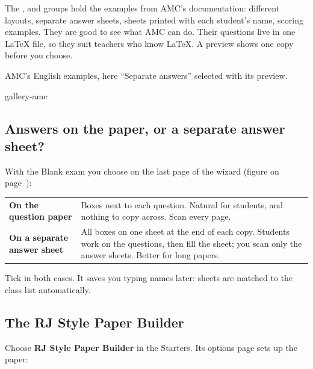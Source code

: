 \documentclass[11pt]{article}
\begin{document}
The ,  and  groups hold the examples from AMC's documentation: different layouts, separate answer sheets, sheets printed with each student's name, scoring examples. They are good to see what AMC can do. Their questions live in one LaTeX file, so they suit teachers who know LaTeX. A preview shows one copy before you choose.

\begin{guidefig}{AMC's English examples, here ``Separate answers'' selected with its preview.}
\begin{shot}{gallery-amc}
\end{shot}
\end{guidefig}

\subsection{Answers on the paper, or a separate answer sheet?}

With the Blank exam you choose on the last page of the wizard (figure on page~\pageref{sec:create}):

\begin{panel}
\renewcommand{\arraystretch}{1.35}
\begin{tabularx}{\linewidth}{@{}>{\bfseries}p{40mm}X@{}}
On the question paper & Boxes next to each question. Natural for students, and nothing to copy across. Scan every page.\\
On a separate answer sheet & All boxes on one sheet at the end of each copy. Students work on the questions, then fill the sheet; you scan only the answer sheets. Better for long papers.\\
\end{tabularx}
\end{panel}

\begin{tip}
Tick  in both cases. It saves you typing names later: sheets are matched to the class list automatically.
\end{tip}

\subsection{The RJ Style Paper Builder}\label{sec:builder}

Choose \textbf{RJ Style Paper Builder} in the Starters. Its options page sets up the paper:
\end{document}
